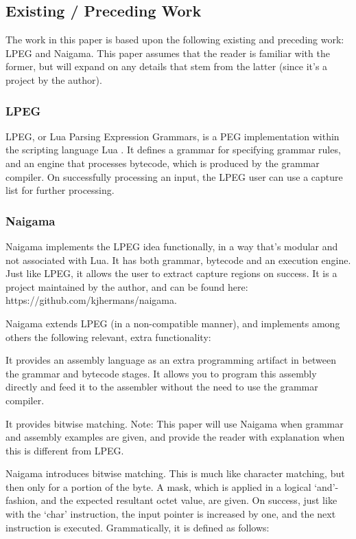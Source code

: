 \subsection{Existing / Preceding Work}
The work in this paper is based upon the following existing and preceding 
work: LPEG and Naigama. This paper assumes that the reader is familiar 
with the former, but will expand on any details that stem from the latter 
(since it’s a project by the author).

\subsubsection{LPEG}
LPEG, or Lua Parsing Expression Grammars, is a PEG implementation within 
the scripting language Lua \cite{bib:lua} \cite{bib:lpeg}.
It defines a grammar for specifying 
grammar rules, and an engine that processes bytecode, which is produced by 
the grammar compiler. On successfully processing an input, the LPEG user 
can use a capture list for further processing.

\subsubsection{Naigama}
Naigama \cite{bib:naigama}
implements the LPEG idea functionally, in a way that’s 
modular and not associated with Lua. It has both grammar, bytecode and an 
execution engine. Just like LPEG, it allows the user to extract capture 
regions on success. It is a project maintained by the author, and can be 
found here: https://github.com/kjhermans/naigama.

Naigama extends LPEG (in a non-compatible manner), and implements among 
others the following relevant, extra functionality:
    \item It provides an assembly language as an extra programming artifact 
in between the grammar and bytecode stages. It allows you to program this 
assembly directly and feed it to the assembler without the need to use the 
grammar compiler.
    \item It provides bitwise matching.
Note: This paper will use Naigama when grammar and assembly examples are 
given, and provide the reader with explanation when this is different from 
LPEG.


Naigama introduces bitwise matching. This is much like character matching, 
but then only for a portion of the byte. A mask, which is applied in a 
logical ‘and’-fashion, and the expected resultant octet value, are 
given. On success, just like with the ‘char’ instruction, the input 
pointer is increased by one, and the next instruction is executed. 
Grammatically, it is defined as follows:

